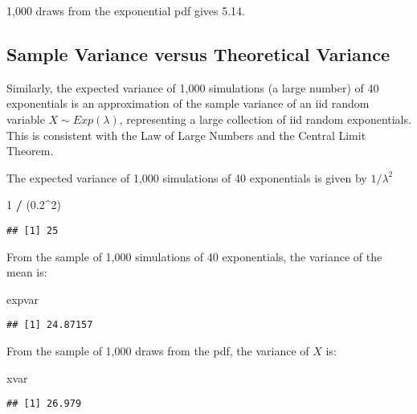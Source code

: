 \documentclass[]{article}
\newenvironment{Shaded}{\begin{snugshade}}{\end{snugshade}}
\newcommand{\DecValTok}[1]{\textcolor[rgb]{0.00,0.00,0.81}{#1}}
\newcommand{\FloatTok}[1]{\textcolor[rgb]{0.00,0.00,0.81}{#1}}
\newcommand{\NormalTok}[1]{#1}
\newcommand{\OperatorTok}[1]{\textcolor[rgb]{0.81,0.36,0.00}{\textbf{#1}}}
\newcommand{\StringTok}[1]{\textcolor[rgb]{0.31,0.60,0.02}{#1}}
\begin{document}
1,000 draws from the exponential pdf gives 5.14.

\hypertarget{sample-variance-versus-theoretical-variance}{%
\subsection{Sample Variance versus Theoretical
Variance}\label{sample-variance-versus-theoretical-variance}}

Similarly, the expected variance of 1,000 simulations (a large number)
of 40 exponentials is an approximation of the sample variance of an iid
random variable \(X \sim Exp(\lambda)\), representing a large collection
of iid random exponentials. This is consistent with the Law of Large
Numbers and the Central Limit Theorem.

The expected variance of 1,000 simulations of 40 exponentials is given
by \(1/\lambda^2\)

\begin{Shaded}
\begin{Highlighting}[]
\DecValTok{1} \OperatorTok{/}\StringTok{ }\NormalTok{(}\FloatTok{0.2}\OperatorTok{^}\DecValTok{2}\NormalTok{)}
\end{Highlighting}
\end{Shaded}

\begin{verbatim}
## [1] 25
\end{verbatim}

From the sample of 1,000 simulations of 40 exponentials, the variance of
the mean is:

\begin{Shaded}
\begin{Highlighting}[]
\NormalTok{expvar}
\end{Highlighting}
\end{Shaded}

\begin{verbatim}
## [1] 24.87157
\end{verbatim}

From the sample of 1,000 draws from the pdf, the variance of \(X\) is:

\begin{Shaded}
\begin{Highlighting}[]
\NormalTok{xvar}
\end{Highlighting}
\end{Shaded}

\begin{verbatim}
## [1] 26.979
\end{verbatim}
\end{document}
